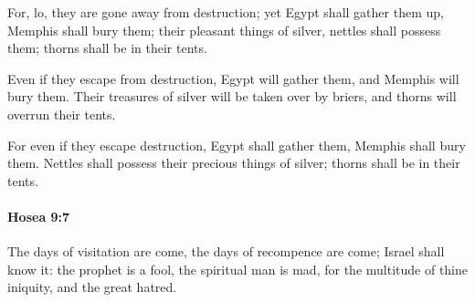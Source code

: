 			\begin{versebox}
					\item[BHS] 
					\item[LXX] 
					\item[ASV] For, lo, they are gone away from destruction; yet Egypt shall gather them up, Memphis shall bury them; their pleasant things of silver, nettles shall possess them; thorns shall be in their tents.
					\item[NIV] Even if they escape from destruction, Egypt will gather them, and Memphis will bury them. Their treasures of silver will be taken over by briers, and thorns will overrun their tents.
					\item[NRSV] For even if they escape destruction, Egypt shall gather them, Memphis shall bury them. Nettles shall possess their precious things of silver; thorns shall be in their tents.
			\end{versebox}

		\paragraph{Hosea 9:7} %
			\label{HOSEA-9-7}

			The days of visitation are come, the days of recompence are come; Israel shall know it: the prophet is a fool, the spiritual man is mad, for the multitude of thine iniquity, and the great hatred.

